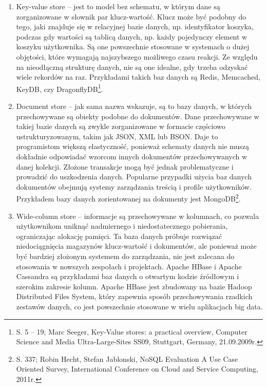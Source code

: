 \documentclass[12pt, a4paper, twoside, openany]{book}
\begin{document}
\begin{enumerate}[label=--]
    \item Key-value store -- jest to model bez schematu, w którym dane są zorganizowane w słownik par klucz-wartość.
          Klucz może być podobny do tego, jaki znajduje się w relacyjnej bazie danych, np. identyfikator koszyka, podczas gdy wartości są tablicą danych, np. każdy pojedynczy element w koszyku użytkownika.
          Są one powszechnie stosowane w systemach o dużej objętości, które wymagają najszybszego możliwego czasu reakcji.
          Ze względu na nieodłączną strukturę danych, nie są one idealne, gdy trzeba odzyskać wiele rekordów na raz.
          Przykładami takich baz danych są Redis, Memcached, KeyDB, czy DragonflyDB\footnote{S. 5 -- 19; Marc Seeger, Key-Value stores: a practical overview, Computer Science and Media Ultra-Large-Sites SS09, Stuttgart, Germany, 21.09.2009r.}.
    \item Document store -- jak sama nazwa wskazuje, są to bazy danych, w których przechowywane są obiekty podobne do dokumentów.
          Dane przechowywane w takiej bazie danych są zwykle zorganizowane w formacie częściowo ustrukturyzowanym, takim jak JSON, XML lub BSON.
          Daje to programistom większą elastyczność, ponieważ schematy danych nie muszą dokładnie odpowiadać wzorcom innych dokumentów przechowywanych w danej kolekcji.
          Złożone transakcje mogą być jednak problematyczne i prowadzić do uszkodzenia danych.
          Popularne przypadki użycia baz danych dokumentów obejmują systemy zarządzania treścią i profile użytkowników.
          Przykładem bazy danych zorientowanej na dokumenty jest MongoDB\footnote{S. 337; Robin Hecht, Stefan Jablonski, NoSQL Evaluation A Use Case Oriented Survey, International Conference on Cloud and Service Computing, 2011r.}.
    \item Wide-column store -- informacje są przechowywane w kolumnach, co pozwala użytkownikom uniknąć nadmiernego i niedostatecznego pobierania, ograniczając alokację pamięci.
          Ta baza danych próbuje rozwiązać niedociągnięcia magazynów klucz-wartość i dokumentów, ale ponieważ może być bardziej złożonym systemem do zarządzania, nie jest zalecana do stosowania w nowszych zespołach i projektach.
          Apache HBase i Apache Cassandra są przykładami baz danych o otwartym kodzie źródłowym i szerokim zakresie kolumn.
          Apache HBase jest zbudowany na bazie Hadoop Distributed Files System, który zapewnia sposób przechowywania rzadkich zestawów danych, co jest powszechnie stosowane w wielu aplikacjach big data.

\end{enumerate}
\end{document}

